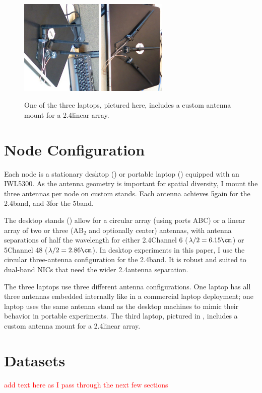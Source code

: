 \begin{figure}[ht]
	\centering
	\includegraphics[angle=90,height=1.8in]{figures/laptop_stand_cropped_up.png}%
	\hspace{0.6in}%
	\includegraphics[angle=90,height=1.8in]{figures/laptop_stand_cropped.png}
	\caption[A custom laptop antenna stand]{\label{fig:laptop_stands}One of the three laptops, pictured here, includes a custom antenna mount for a 2.4\GHz linear array.}
\end{figure}

\section{Node Configuration}
Each node is a stationary desktop () or portable laptop () equipped with an IWL5300. As the antenna geometry is important for spatial diversity, I mount the three antennas per node on custom stands. Each antenna achieves 5\dBi gain for the 2.4\GHz band, and 3\dBi for the 5\GHz band.

The desktop stands () allow for a circular array (using ports ABC) or a linear array of two or three (AB$_2$ and optionally center) antennas, with antenna separations of half the wavelength for either 2.4\GHz Channel 6 ($\lambda/2 = 6.15\cm$) or 5\GHz Channel 48 ($\lambda/2=2.86\cm$). In desktop experiments in this paper, I use the circular three-antenna configuration for the 2.4\GHz band. It is robust and suited to dual-band NICs that need the wider 2.4\GHz antenna separation. 

The three laptops use three different antenna configurations. One laptop has all three antennas embedded internally like in a commercial laptop deployment; one laptop uses the same antenna stand as the desktop machines to mimic their behavior in portable experiments. The third laptop, pictured in , includes a custom antenna mount for a 2.4\GHz linear array.
\section{Datasets}
\textcolor{red}{add text here as I pass through the next few sections}

\ifx\mainfile\undefined

\fi